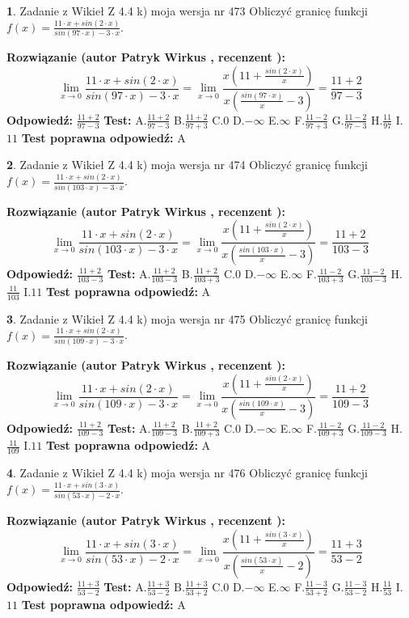 \documentclass[12pt, a4paper]{article}
\theoremstyle{definition} %
\newtheorem{zad}{}
\newcommand{\zadStart}[1]{\begin{zad}#1\newline}
\newcommand{\zadStop}{\end{zad}}
\newcommand{\rozwStart}[2]{\noindent \textbf{Rozwiązanie (autor #1 , recenzent #2): }\newline}
\newcommand{\rozwStop}{\newline}
\newcommand{\odpStart}{\noindent \textbf{Odpowiedź:}\newline}
\newcommand{\odpStop}{\newline}
\newcommand{\testStart}{\noindent \textbf{Test:}\newline}
\newcommand{\testStop}{\newline}
\newcommand{\kluczStart}{\noindent \textbf{Test poprawna odpowiedź:}\newline}
\newcommand{\kluczStop}{\newline}
\begin{document}
\zadStart{Zadanie z Wikieł Z 4.4 k) moja wersja nr 473}
Obliczyć granicę funkcji $f(x)=\frac{11\cdot x +sin(2\cdot x)}{sin(97\cdot x) -3\cdot x}$.
\zadStop
\rozwStart{Patryk Wirkus}{}
$$\lim\limits_{x\to 0}\frac{11\cdot x +sin(2\cdot x)}{sin(97\cdot x) -3\cdot x}
=\lim\limits_{x\to 0}\frac{x(11+\frac{sin(2\cdot x)}{x})}{x(\frac{sin(97\cdot x)}{x}-3)}
=\frac{11+2}{97-3}$$
\rozwStop
\odpStart
$\frac{11+2}{97-3}$
\odpStop
\testStart
A.$\frac{11+2}{97-3}$
B.$\frac{11+2}{97+3}$
C.$0$
D.$-\infty$
E.$\infty$
F.$\frac{11-2}{97+3}$
G.$\frac{11-2}{97-3}$
H.$\frac{11}{97}$
I.$11$
\testStop
\kluczStart
A
\kluczStop



\zadStart{Zadanie z Wikieł Z 4.4 k) moja wersja nr 474}
Obliczyć granicę funkcji $f(x)=\frac{11\cdot x +sin(2\cdot x)}{sin(103\cdot x) -3\cdot x}$.
\zadStop
\rozwStart{Patryk Wirkus}{}
$$\lim\limits_{x\to 0}\frac{11\cdot x +sin(2\cdot x)}{sin(103\cdot x) -3\cdot x}
=\lim\limits_{x\to 0}\frac{x(11+\frac{sin(2\cdot x)}{x})}{x(\frac{sin(103\cdot x)}{x}-3)}
=\frac{11+2}{103-3}$$
\rozwStop
\odpStart
$\frac{11+2}{103-3}$
\odpStop
\testStart
A.$\frac{11+2}{103-3}$
B.$\frac{11+2}{103+3}$
C.$0$
D.$-\infty$
E.$\infty$
F.$\frac{11-2}{103+3}$
G.$\frac{11-2}{103-3}$
H.$\frac{11}{103}$
I.$11$
\testStop
\kluczStart
A
\kluczStop



\zadStart{Zadanie z Wikieł Z 4.4 k) moja wersja nr 475}
Obliczyć granicę funkcji $f(x)=\frac{11\cdot x +sin(2\cdot x)}{sin(109\cdot x) -3\cdot x}$.
\zadStop
\rozwStart{Patryk Wirkus}{}
$$\lim\limits_{x\to 0}\frac{11\cdot x +sin(2\cdot x)}{sin(109\cdot x) -3\cdot x}
=\lim\limits_{x\to 0}\frac{x(11+\frac{sin(2\cdot x)}{x})}{x(\frac{sin(109\cdot x)}{x}-3)}
=\frac{11+2}{109-3}$$
\rozwStop
\odpStart
$\frac{11+2}{109-3}$
\odpStop
\testStart
A.$\frac{11+2}{109-3}$
B.$\frac{11+2}{109+3}$
C.$0$
D.$-\infty$
E.$\infty$
F.$\frac{11-2}{109+3}$
G.$\frac{11-2}{109-3}$
H.$\frac{11}{109}$
I.$11$
\testStop
\kluczStart
A
\kluczStop



\zadStart{Zadanie z Wikieł Z 4.4 k) moja wersja nr 476}
Obliczyć granicę funkcji $f(x)=\frac{11\cdot x +sin(3\cdot x)}{sin(53\cdot x) -2\cdot x}$.
\zadStop
\rozwStart{Patryk Wirkus}{}
$$\lim\limits_{x\to 0}\frac{11\cdot x +sin(3\cdot x)}{sin(53\cdot x) -2\cdot x}
=\lim\limits_{x\to 0}\frac{x(11+\frac{sin(3\cdot x)}{x})}{x(\frac{sin(53\cdot x)}{x}-2)}
=\frac{11+3}{53-2}$$
\rozwStop
\odpStart
$\frac{11+3}{53-2}$
\odpStop
\testStart
A.$\frac{11+3}{53-2}$
B.$\frac{11+3}{53+2}$
C.$0$
D.$-\infty$
E.$\infty$
F.$\frac{11-3}{53+2}$
G.$\frac{11-3}{53-2}$
H.$\frac{11}{53}$
I.$11$
\testStop
\kluczStart
A
\kluczStop
\end{document}
